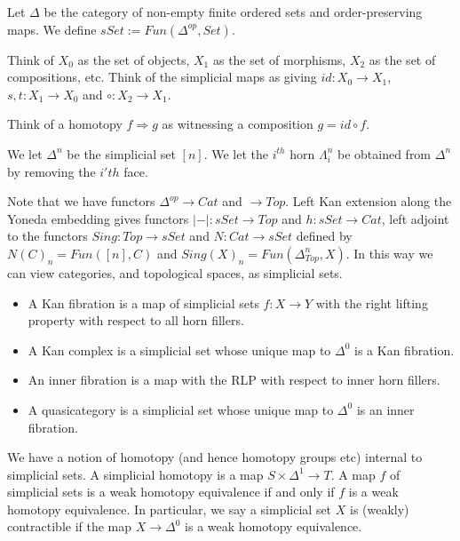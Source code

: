 Let $\Delta$ be the category of non-empty finite ordered sets and order-preserving maps. We define  $sSet:=Fun(\Delta^{op},Set)$.

\begin{remark}
    Think of $X_0$ as the set of objects, $X_1$ as the set of morphisms, $X_2$ as the set of compositions, etc. Think of the simplicial maps as giving $id:X_0\rightarrow X_1$, $s,t:X_1\rightarrow X_0$ and $\circ:X_2\rightarrow X_1$. 
\end{remark}

\begin{remark}
Think of a homotopy $f\Rightarrow g$ as witnessing a composition $g=id\circ f$.     
\end{remark}

We let $\Delta^n$ be the simplicial set $[n]$. We let the $i^{th}$ horn $\Lambda^{n}_i$ be obtained from $\Delta^n$ by removing the $i'th$ face. 

Note that we have functors $\Delta^{op}\rightarrow Cat$ and $\rightarrow Top$. Left Kan extension along the Yoneda embedding gives functors $|-|:sSet\rightarrow Top$ and $h:sSet \rightarrow Cat$, left adjoint to the functors $Sing:Top\rightarrow sSet$ and $N:Cat\rightarrow sSet$ defined by $N(C)_n=Fun([n],C)$ and $Sing(X)_n=Fun(\Delta^n_{Top},X)$. In this way we can view categories, and topological spaces, as simplicial sets.

\begin{definition}

\begin{itemize}
    \item A Kan fibration is a map of simplicial sets $f:X\rightarrow Y$ with the right lifting property with respect to all horn fillers.
    \item A Kan complex is a simplicial set whose unique map to $\Delta^0$ is a Kan fibration.
    \item An inner fibration is a map with the RLP with respect to inner horn fillers.
    \item A quasicategory is a simplicial set whose unique map to $\Delta^0$ is an inner fibration.
\end{itemize}    
\end{definition}

We have a notion of homotopy (and hence homotopy groups etc) internal to simplicial sets. A simplicial homotopy is a map $S\times \Delta^1\rightarrow T$. A map $f$ of simplicial sets is a weak homotopy equivalence if and only if $f$ is a weak homotopy equivalence. In particular, we say a simplicial set $X$ is (weakly) contractible if the map $X\rightarrow \Delta^0$ is a weak homotopy equivalence.

